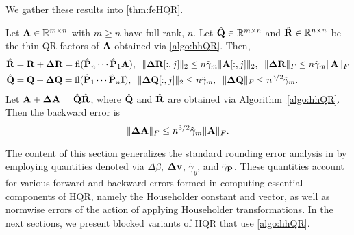 We gather these results into \cref{thm:feHQR}.
\begin{theorem}
	\label{thm:feHQR}
	Let $\mathbf{A}\in\mathbb{R}^{m\times n}$ with $m\geq n$ have full rank, $n$. 
	Let $\hat{\mathbf{Q}}\in\mathbb{R}^{m\times n}$ and $\hat{\mathbf{R}}\in\mathbb{R}^{n\times n}$ be the thin QR factors of $\mathbf{A}$ obtained via \cref{algo:hhQR}.
	Then,
	\begin{align*}
	\hat{\mathbf{R}} &= \mathbf{R} + \mathbf{\Delta R} = \mathrm{fl}(\hat{\mathbf{P}}_n\cdots\hat{\mathbf{P}}_1 \mathbf{A}),\;\; \|\mathbf{\Delta R}[:,j]\|_2\leq n\tilde{\gamma}_{m} \|\mathbf{A}[:,j]\|_2,\;\; \|\mathbf{\Delta R}\|_F\leq n\tilde{\gamma}_{m} \|\mathbf{A}\|_F\\
	\hat{\mathbf{Q}} &= \mathbf{Q} + \mathbf{\Delta Q} = \mathrm{fl}(\hat{\mathbf{P}}_1\cdots\hat{\mathbf{P}}_n \mathbf{I}),\;\; \|\mathbf{\Delta Q}[:,j]\|_2\leq n\tilde{\gamma}_{m},\;\; \|\mathbf{\Delta Q}\|_F \leq n^{3/2} \tilde{\gamma}_{m}.
	\end{align*}
	Let $\mathbf{A}+\mathbf{\Delta A} = \hat{\mathbf{Q}}\hat{\mathbf{R}}$, where $\hat{\mathbf{Q}}$ and $\hat{\mathbf{R}}$ are obtained via Algorithm~\ref{algo:hhQR}.
	Then the backward error is
	\begin{equation}
	\|\mathbf{\Delta A}\|_F \leq n^{3/2}\tilde{\gamma}_{m}\|\mathbf{A}\|_F.
	\end{equation}
\end{theorem}

The content of this section generalizes the standard rounding error analysis in \cite{Higham2002} by employing quantities denoted via $\Delta \beta$, $\mathbf{\Delta v}$, $\tilde{\gamma}_y$, and $\tilde{\gamma}_{\mathbf{P}}$. 
These quantities account for various forward and backward errors formed in computing essential components of HQR, namely the Householder constant and vector, as well as normwise errors of the action of applying Householder transformations.
In the next sections, we present blocked variants of HQR that use \cref{algo:hhQR}.